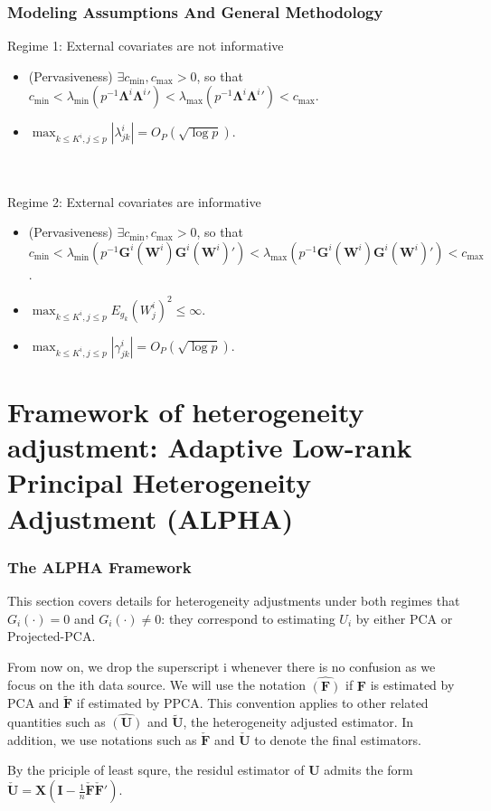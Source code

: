 \documentclass{beamer}
\begin{document}

\begin{frame}
	\frametitle{Modeling Assumptions And General Methodology}
	Regime 1: External covariates are not informative
	\begin{itemize}
		\item (Pervasiveness) $\exists c_{\text{min}}, c_{\text{max}} > 0$, so that $c_{\text{min}} < \lambda_{\text{min}}(p^{-1}\boldsymbol{\Lambda}^i {\boldsymbol{\Lambda}^i}') < \lambda_{\text{max}}(p^{-1}\boldsymbol{\Lambda}^i {\boldsymbol{\Lambda}^i}') < c_{\text{max}}$.
		\item $\max_{k \leq K^i, j \leq p} |\lambda_{jk}^i| = O_P(\sqrt{\log p})$.
	\end{itemize}
	\\~\\
	Regime 2: External covariates are informative
	\begin{itemize}
		\item (Pervasiveness) $\exists c_{\text{min}}, c_{\text{max}} > 0$, so that $c_{\text{min}} < \lambda_{\text{min}}(p^{-1}\mathbf{G}^i(\mathbf{W}^i) {\mathbf{G}^i(\mathbf{W}^i)}') < \lambda_{\text{max}}(p^{-1}\mathbf{G}^i(\mathbf{W}^i) {\mathbf{G}^i(\mathbf{W}^i)}') < c_{\text{max}}$.
		\item $\max_{k \leq K^i, j \leq p}E_{g_k}{(W_j^i)}^2 \leq \infty$.
		\item $\max_{k \leq K^i, j \leq p} |\gamma_{jk}^i| = O_P(\sqrt{\log p})$.
	\end{itemize}
	
\end{frame}

\section{Framework of heterogeneity adjustment: Adaptive Low-rank Principal Heterogeneity Adjustment (ALPHA)}

\begin{frame}
\frametitle{The ALPHA Framework}
This section covers details for heterogeneity adjustments under both regimes that $G_i(·) = 0$ and $G_i(·) \neq 0$: they correspond to estimating $U_i$ by either PCA or Projected-PCA. 

From now on, we drop the superscript i whenever there is no confusion as we focus on the ith data source. We will use the notation $\hat{(\mathbf{F})}$ if $ \mathbf{F} $ is estimated by PCA and $ \tilde{\mathbf{F}}$ if estimated by PPCA. This convention applies to other related quantities such as $\hat{(\mathbf{U})}$ and $ \tilde{\mathbf{U}}$, the heterogeneity adjusted estimator. In addition, we use notations such as $ \check{\mathbf{F}} $ and $\check{\mathbf{U}}$ to denote the final estimators.

By the priciple of least squre, the residul estimator of $\mathbf{U}$ admits the form $\check{\mathbf{U}} = \mathbf{X} (\mathbf{I} - \frac{1}{n}\check{\mathbf{F}}\check{\mathbf{F}}')$.
\end{frame}
\end{document}
